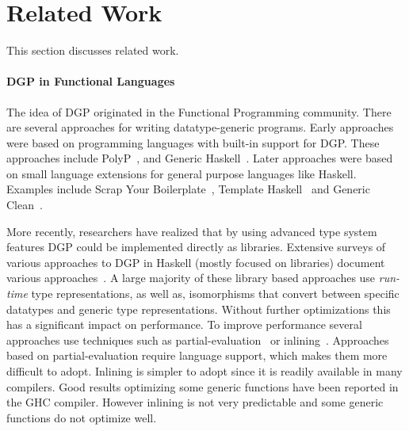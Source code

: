 \documentclass[preprint,nocopyrightspace]{sigplanconf}
\newcommand{\selfassembly}{\texttt{self-assembly~}}
\begin{document}

\section{Related Work}
\label{sec:related-work}

This section discusses related work.


\paragraph{DGP in Functional Languages}
The idea of DGP originated in the Functional Programming community.
There are several approaches for writing datatype-generic
programs. Early approaches were based on programming languages with
built-in support for DGP. These approaches include PolyP~\cite{PolyPJansson},
and Generic Haskell~\cite{GenericHaskell}. Later approaches were
based on small language extensions for general purpose languages like
Haskell. Examples include Scrap Your Boilerplate~\cite{SYB}, Template
Haskell~\cite{template-haskell} and Generic Clean~\cite{GenericClean}.

More recently, researchers have realized that by using advanced type
system features DGP could be implemented directly as
libraries. Extensive surveys of various approaches to DGP in Haskell
(mostly focused on libraries) document various
approaches~\cite{ComparingGPHaskellRodriquez,ComparingGPHaskellHinze}. A
large majority of these library based approaches use \emph{run-time}
type representations, as well as, isomorphisms that convert between
specific datatypes and generic type representations. Without further
optimizations this has a significant impact on performance. To improve
performance several approaches use techniques such as
partial-evaluation~\cite{DGPPartial} or inlining~\cite{OptimizingDGP}.
Approaches based on partial-evaluation require language support, which
makes them more difficult to adopt. Inlining is simpler to adopt since
it is readily available in many compilers.  Good results optimizing
some generic functions have been reported in the GHC compiler. However
inlining is not very predictable and some generic functions do not
optimize well.
\end{document}
